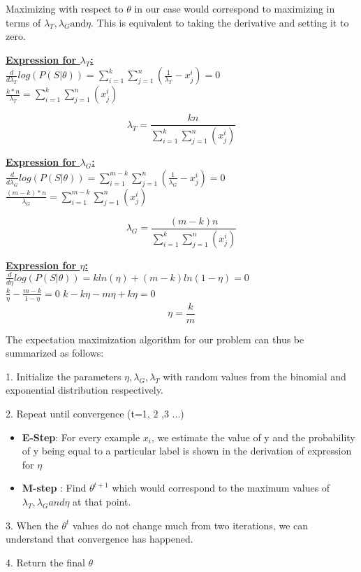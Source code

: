 \documentclass[11pt]{article}
\begin{document}
\begin{itemize}
	 Maximizing with respect to $\theta$ in our case would correspond to maximizing in terms of $\lambda_T, \lambda_G \text{and} \eta$. This is equivalent to taking the derivative and setting it to zero.
	 
	 \textbf{\underline{Expression for $\lambda_T$:}}\\
	  $ \frac{d}{d\lambda_T} log(P(S| \theta)) = \sum_{i=1}^{k} \sum_{j=1}^{n} (\frac{1}{\lambda_T} - x_j ^i )=0$ \\
	  
	  $\frac{k * n}{\lambda_T} = \sum_{i=1}^{k} \sum_{j=1}^{n} (x_{j}^{i})$
	  
	  $$\boxed{\lambda_T =\frac{kn}{\sum_{i=1}^{k} \sum_{j=1}^{n} (x_{j}^{i})}}$$
	  
	   \textbf{\underline{Expression for $\lambda_G$:}}\\
	   $ \frac{d}{d\lambda_G} log(P(S| \theta)) = \sum_{i=1}^{m-k} \sum_{j=1}^{n} (\frac{1}{\lambda_G} - x_j ^i )=0$ \\
	   
	   $\frac{(m-k) * n}{\lambda_G} = \sum_{i=1}^{m-k} \sum_{j=1}^{n} (x_{j}^{i})$
	   
	   $$\boxed{\lambda_G =\frac{(m-k)n}{\sum_{i=1}^{k} \sum_{j=1}^{n} (x_{j}^{i})}}$$
	   
	   \textbf{\underline{Expression for $\eta$:}}\\
	     $ \frac{d}{d\eta} log(P(S| \theta)) = k ln(\eta) + (m-k) ln (1- \eta) =0$\\
	     $ \frac{k}{\eta} - \frac{m-k}{1- \eta} =0$
	     $k -k\eta -m\eta +k\eta =0$
	     $$\boxed{\eta= \frac{k}{m}}$$
	     
	     The expectation maximization algorithm for our problem can thus be summarized as follows:
	     
	     1. Initialize the parameters $\eta, \lambda_G, \lambda_T $ with random values from the binomial and exponential distribution respectively.
	     
	     2. Repeat until convergence (t=1, 2 ,3 ...)
	     \begin{itemize}
	     \item \textbf{E-Step}: For every example $x_i$, we estimate the value of y and the probability of y being equal to a particular label is  shown in the derivation of expression for $\eta$
	     
	     \item \textbf{M-step} : Find $\theta ^{t+1} $ which would correspond to the maximum values of $\lambda_T, \lambda_G and \eta $ at that point.
	     
	    
	     \end{itemize}
	   3. When the $\theta^t$ values do not change much from two iterations, we can understand that convergence has happened.
	   
	   4. Return the final $\theta$    	
	 
\end{itemize}	
\end{document}
